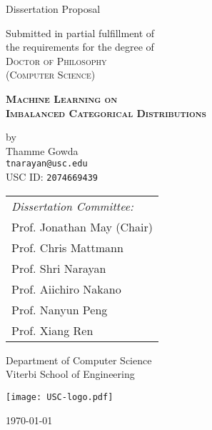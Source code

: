 \begin{titlepage}
	\centering
	\vspace{1cm}
	{\large Dissertation Proposal \par}
	\vspace{2mm}
	{\large Submitted in partial fulfillment of \\ the requirements for the degree of }\\
	\vspace{1mm}
	{\scshape\large Doctor of Philosophy \\ \vspace{1mm} (Computer Science)}
	\vspace{1.5cm}
	
	{{\scshape \LARGE \bfseries Machine Learning on\\\vspace{2mm} Imbalanced Categorical Distributions}}
	\par
	\vspace{2mm}
	\par
	\vspace{5mm}
	{by\\
	{\large Thamme Gowda}\\
	\texttt{tnarayan@usc.edu}\\
	USC ID: \texttt{2074669439}\\\vspace{1cm} }

	{\large
    	\begin{tabular}{l}
    	\textit{Dissertation Committee:} \vspace{1mm} \\
    	Prof. Jonathan May {\footnotesize{(Chair)}} \\
     	Prof. Chris Mattmann \\
        Prof. Shri Narayan \\     	
     	Prof. Aiichiro Nakano \\
     	Prof. Nanyun Peng \\
     	Prof. Xiang Ren \\
    	\end{tabular}
	}
	\vfill
	
	{\scshape\large{Department of Computer Science\\ Viterbi School of Engineering \par}}
	\texttt{[image: USC-logo.pdf]}
	\par
	\vspace{1cm}
	
{\scshape \today \par}
\end{titlepage}

